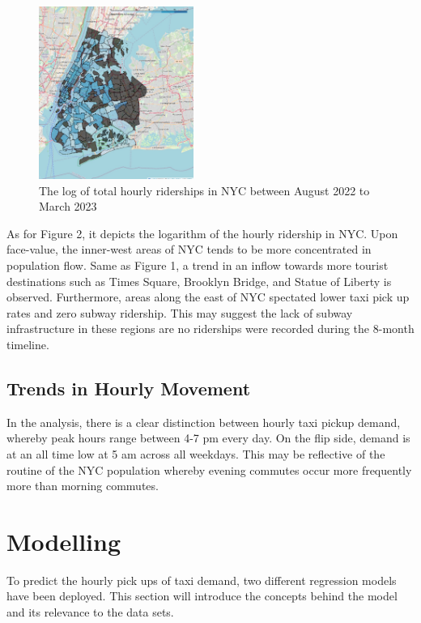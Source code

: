 \documentclass[11pt]{article}
\begin{document}
\begin{figure}
    \centering
    \includegraphics[width=0.45\textwidth]{plots/NYC Total Ridership.jpeg}
    \caption{The log of total hourly riderships in NYC between August 2022 to March 2023} %
    \centering
\end{figure}

As for Figure 2, it depicts the logarithm of the hourly ridership in NYC. Upon face-value, the inner-west areas of NYC tends to be more concentrated in population flow. Same as Figure 1, a trend in an inflow towards more tourist destinations such as Times Square, Brooklyn Bridge, and Statue of Liberty is observed. Furthermore, areas along the east of NYC spectated lower taxi pick up rates and zero subway ridership. This may suggest the lack of subway infrastructure in these regions are no riderships were recorded during the 8-month timeline. 

\subsection{Trends in Hourly Movement}
In the analysis, there is a clear distinction between hourly taxi pickup demand, whereby peak hours range between 4-7 pm every day. On the flip side, demand is at an all time low at 5 am across all weekdays. This may be reflective of the routine of the NYC population whereby evening commutes occur more frequently more than morning commutes.

\section{Modelling}
To predict the hourly pick ups of taxi demand, two different regression models have been deployed. This section will introduce the concepts behind the model and its relevance to the data sets.
\end{document}
